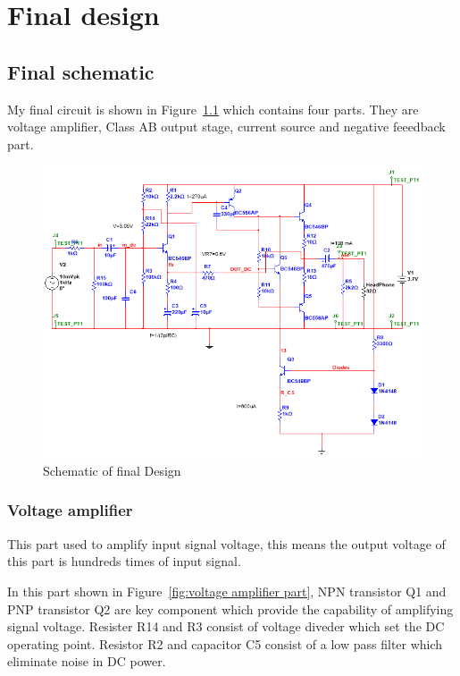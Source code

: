\chapter{Final design}

\section{Final schematic}

My final circuit is shown in Figure~\ref{fig:final schematic} which contains four parts. They are voltage amplifier, Class AB output stage, current source and negative feeedback part.



\begin{figure}[htbp]
	\centering
	\includegraphics[scale=0.8]{"../Photo/Chap5/final schematic"}
	\caption{Schematic of final Design }
	\label{fig:final schematic}
\end{figure}


\subsection{Voltage amplifier}  

This part used to amplify input signal voltage, this means the output voltage of this part is hundreds times of input signal.


In this part shown in Figure~\ref{fig:voltage amplifier part}, NPN transistor Q1 and PNP transistor Q2 are key component which provide the capability of amplifying signal voltage. Resister R14 and R3 consist of voltage diveder which set the DC operating point. Resistor R2 and capacitor C5 consist of a low pass filter which eliminate noise in DC power.


